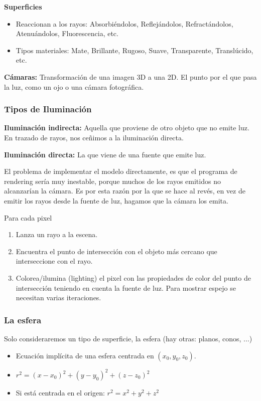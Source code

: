 \textbf{Superficies}
\begin{itemize}
    \item Reaccionan a los rayos: Absorbiéndolos, Reflejándolos, Refractándolos, Atenuándolos, Fluorescencia, etc.
    \item Tipos materiales: Mate, Brillante, Rugoso, Suave, Transparente, Translúcido, etc.
\end{itemize}

\textbf{Cámaras:} Transformación de una imagen 3D a una 2D. El punto por el que pasa la luz, como un ojo o una cámara fotográfica.

\subsubsection{Tipos de Iluminación}
\textbf{Iluminación indirecta:} Aquella que proviene de otro objeto que no emite luz. En trazado de rayos, nos ceñimos a la iluminación directa.

\textbf{Iluminación directa:} La que viene de una fuente que emite luz.

El problema de implementar el modelo directamente, es que el programa de rendering sería muy inestable, porque muchos de los rayos emitidos no alcanzarían la cámara. Es por esta razón por la que se hace al revés, en vez de emitir los rayos desde la fuente de luz, hagamos que la cámara los emita.

Para cada pixel
\begin{enumerate}
    \item Lanza un rayo a la escena.
    \item Encuentra el punto de intersección con el objeto más cercano que interseccione con el rayo.
    \item Colorea/ilumina (lighting) el pixel con las propiedades de color del punto de intersección teniendo en cuenta la fuente de luz. Para mostrar espejo se necesitan varias iteraciones.
\end{enumerate}

\subsubsection{La esfera} 
Solo consideraremos un tipo de superficie, la esfera (hay otras: planos, conos, ...)
\begin{itemize}
    \item Ecuación implícita de una esfera centrada en $(x_0, y_0, z_0)$.
    \item $r^2=(x-x_0)^2+(y-y_0)^2+(z-z_0)^2$
    \item Si está centrada en el origen: $r^2=x^2+y^2+z^2$
\end{itemize}

